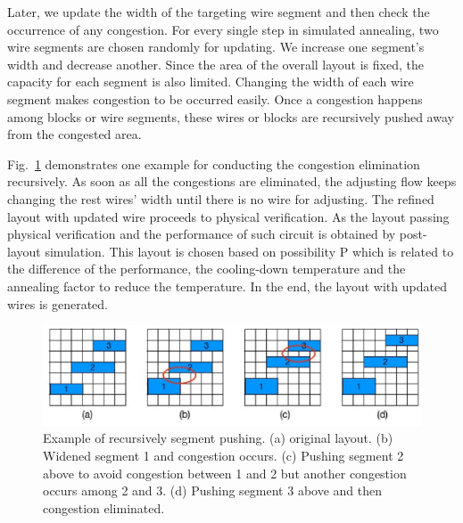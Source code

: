   Later, we update the width of the targeting wire segment and then check the occurrence of any congestion. For every single step in simulated annealing, two wire segments are chosen randomly for updating. We increase one segment's width and decrease another. Since the area of the overall layout is fixed, the capacity for each segment is also limited. Changing the width of each wire segment makes congestion to be occurred easily. Once a congestion happens among blocks or wire segments, these wires or blocks are recursively pushed away from the congested area.

  Fig.~\ref{fig:Congestion} demonstrates one example for conducting the congestion elimination recursively. As soon as all the congestions are eliminated, the adjusting flow keeps changing the rest wires' width until there is no wire for adjusting. The refined layout with updated wire proceeds to physical verification. As the layout passing physical verification and the performance of such circuit is obtained by post-layout simulation. This layout is chosen based on possibility P which is related to the difference of the performance, the cooling-down temperature and the annealing factor to reduce the temperature. In the end, the layout with updated wires is generated.
  \begin{figure}[t]
    \centering
    \centerline{\includegraphics[width=\textwidth]{Fig/Congestion.eps}}
    \caption{Example of recursively segment pushing. (a) original layout. (b) Widened segment 1 and congestion occurs. (c) Pushing segment 2 above to avoid congestion between 1 and 2 but another congestion occurs among 2 and 3. (d) Pushing segment 3 above and then congestion eliminated.} 
    \label{fig:Congestion}
  \end{figure}